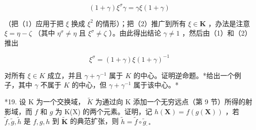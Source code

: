 \[
(1 + \gamma) \xi^ {\sigma} \gamma = \gamma \xi (1 + \gamma)\tag{2}
\]

（把（1）应用于把 \(\xi\) 换成 \(\xi^2\) 的情形）；把（2）推广到所有 \(\xi \in \mathbf{K}\) ，办法是注意 \(\xi = \eta - \zeta\) （其中 \(\eta^\sigma \neq \eta\) 且 \(\xi^\sigma \neq \zeta\) ）。由此得出结论 \(\gamma \neq 1\) ，然后由（1）和（2）推出

\[
\xi^ {\sigma} = (1 + \gamma) \xi (1 + \gamma) ^ {- 1}\tag{3}
\]

对所有 \(\xi \in K\) 成立，并且 \(\gamma + \gamma^{-1}\) 属于 \(K\) 的中心。证明逆命题。*给出一个例子，其中 \(\gamma\) 不属于 \(K\) 的中心，但 \(\gamma + \gamma^{-1}\) 属于该中心。*

*19. 设 K 为一个交换域， \(\tilde{K}\) 为通过向 K 添加一个无穷远点（第 9 节）所得的射影域，而 \(f\) 和 \(g\) 为 K(X) 的两个元素。证明，记 \(h(\mathbf{X}) = f(g(\mathbf{X}))\) ，若 \(\tilde{f}, \tilde{g}, \tilde{h}\) 是 \(f, g, h\) 到 \(\tilde{\mathbf{K}}\) 的典范扩张，则 \(\tilde{h} = \tilde{f} \circ \tilde{g}_{\cdot *}\)

